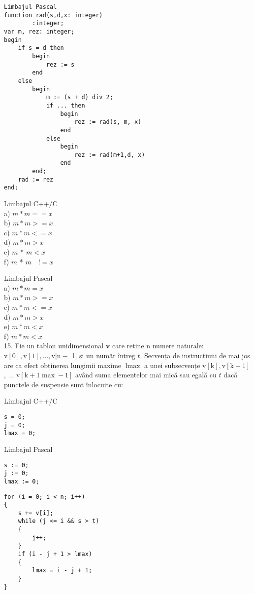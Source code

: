 \begin{verbatim}
Limbajul Pascal
function rad(s,d,x: integer)
        :integer;
var m, rez: integer;
begin
    if s = d then
        begin
            rez := s
        end
    else
        begin
            m := (s + d) div 2;
            if ... then
                begin
                    rez := rad(s, m, x)
                end
            else
                begin
                    rez := rad(m+1,d, x)
                end
        end;
    rad := rez
end;
\end{verbatim}

Limbajul C++/C\\
a) $m * m==x$\\
b) $m * m>=x$\\
c) $m * m<=x$\\
d) $m * m>x$\\
e) $m$ * $m<x$\\
f) $m$ * $m \quad!=x$

Limbajul Pascal\\
a) $m * m=x$\\
b) $m * m>=x$\\
c) $m * m<=x$\\
d) $m * m>x$\\
e) $m * m<x$\\
f) $m * m<x$\\
15. Fie un tablou unidimensional $\mathbf{v}$ care reține n numere naturale: $\mathrm{v}[\mathrm{0}], \mathrm{v}[1], \ldots, \mathrm{v}[\mathrm{n}-$ 1] și un număr întreg $t$. Secvența de instrucțiuni de mai jos are ca efect obținerea lungimii maxime $\operatorname{lmax}$ a unei subsecvențe $\mathrm{v}[\mathrm{k}], \mathrm{v}[\mathrm{k}+1]$, ... $\mathrm{v}[\mathrm{k}+1 \max -1]$ având suma elementelor mai mică sau egală cu $t$ dacă punctele de suspensie sunt înlocuite cu:

Limbajul C++/C

\begin{verbatim}
s = 0;
j = 0;
lmax = 0;
\end{verbatim}

Limbajul Pascal

\begin{verbatim}
s := 0;
j := 0;
lmax := 0;
\end{verbatim}

\begin{verbatim}
for (i = 0; i < n; i++)
{
    s += v[i];
    while (j <= i && s > t)
    {
        j++;
    }
    if (i - j + 1 > lmax)
    {
        lmax = i - j + 1;
    }
}
\end{verbatim}

